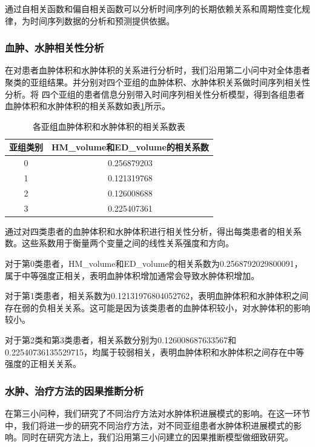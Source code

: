 \documentclass[bwprint]{gmcmthesis}
\begin{document}
通过自相关函数和偏自相关函数可以分析时间序列的长期依赖关系和周期性变化规律，为时间序列数据的分析和预测提供依据。

\subsubsection{血肿、水肿相关性分析}
在对患者血肿体积和水肿体积的关系进行分析时，我们沿用第二小问中对全体患者聚类的亚组结果。并分别对四个亚组的血肿体积、水肿体积关系做时间序列相关性分析。将
四个亚组的患者信息分别带入时间序列相关性分析模型，得到各组患者血肿体积和水肿体积的相关系数如表\ref{tab:血肿水肿相关性}所示。
\begin{table}[ht]
\centering
\caption{各亚组血肿体积和水肿体积的相关系数表}
\label{tab:血肿水肿相关性}
\fontsize{11}{9}\selectfont
\renewcommand\tabcolsep{6pt}
{
\begin{tabular}{cc}
\toprule[1.2pt]
亚组类别 & HM\_volume和ED\_volume的相关系数 \\ \hline
0    & 0.256879203                \\
1    & 0.121319768                \\
2    & 0.126008688                \\
3    & 0.225407361                \\ \bottomrule[1.2pt]
\end{tabular}}
\end{table}

通过对四类患者的血肿体积和水肿体积进行相关性分析，得出每类患者的相关系数。这些系数用于衡量两个变量之间的线性关系强度和方向。

对于第0类患者，HM\_volume和ED\_volume的相关系数为0.2568792029800091，属于中等强度正相关，表明血肿体积增加通常会导致水肿体积增加。

对于第1类患者，相关系数为0.12131976804052762，表明血肿体积和水肿体积之间存在弱的负相关关系。这可能是因为该类患者的血肿体积较小，对水肿体积的影响较小。

对于第2类和第3类患者，相关系数分别为0.126008687633567和0.22540736135529715，均属于较弱相关，表明血肿体积和水肿体积之间存在中等强度的正相关关系。

\subsubsection{水肿、治疗方法的因果推断分析}
在第三小问种，我们研究了不同治疗方法对水肿体积进展模式的影响。在这一环节中，我们将进一步的研究不同治疗方法，对不同亚组患者水肿体积进展模式的影响。同时在研究方法上，我们沿用第三小问建立的因果推断模型做细致研究。
\end{document}
